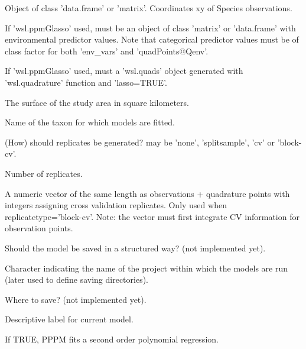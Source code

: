 \documentclass[a4paper]{book}
\begin{document}
\begin{Arguments}
\begin{ldescription}
\item[\code{pres}] Object of class 'data.frame' or 'matrix'. Coordinates xy of Species observations.

\item[\code{env\_vars}] If 'wsl.ppmGlasso' used, must be an object of class 'matrix' or 'data.frame'
with environmental predictor values. Note that categorical predictor values must be of class factor for
both 'env\_vars' and 'quadPoints@Qenv'.

\item[\code{quadPoints}] If 'wsl.ppmGlasso' used, must a 'wsl.quads' object generated with 'wsl.quadrature'
function and 'lasso=TRUE'.

\item[\code{asurface}] The surface of the study area in square kilometers.

\item[\code{taxon}] Name of the taxon for which models are fitted.

\item[\code{replicatetype}] (How) should replicates be generated? may be 'none', 'splitsample',
'cv' or 'block-cv'.

\item[\code{reps}] Number of replicates.

\item[\code{strata}] A numeric vector of the same length as observations + quadrature points with
integers assigning cross validation replicates. Only used when replicatetype='block-cv'.
Note: the vector must first integrate CV information for observation points.

\item[\code{save}] Should the model be saved in a structured way? (not implemented yet).

\item[\code{project}] Character indicating the name of the project within which the models are run
(later used to define saving directories).

\item[\code{path}] Where to save? (not implemented yet).

\item[\code{mod\_tag}] Descriptive label for current model.

\item[\code{poly}] If TRUE, PPPM fits a second order polynomial regression.


\end{ldescription}
\end{Arguments}
\end{document}
